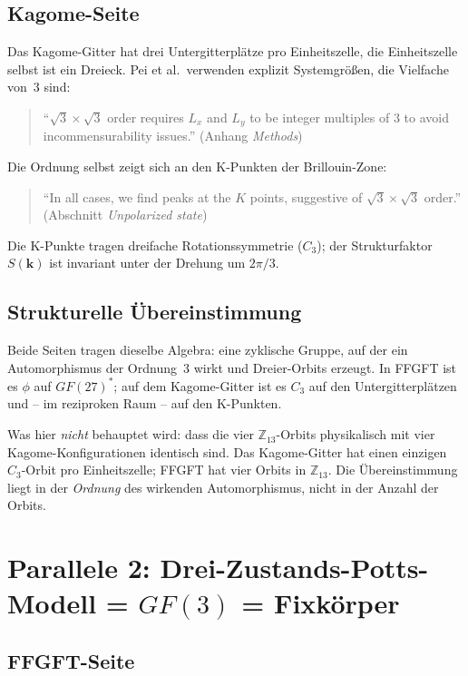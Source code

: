 \subsection{Kagome-Seite}

Das Kagome-Gitter hat drei Untergitterplätze pro Einheitszelle, die
Einheitszelle selbst ist ein Dreieck. Pei et al.\ verwenden explizit
Systemgrößen, die Vielfache von~3 sind:
\begin{quote}\QM
\enquote{$\sqrt{3}\times\sqrt{3}$ order requires $L_x$ and $L_y$ to be
integer multiples of 3 to avoid incommensurability issues.}
(Anhang \emph{Methods})
\end{quote}
Die Ordnung selbst zeigt sich an den K-Punkten der Brillouin-Zone:
\begin{quote}\QM
\enquote{In all cases, we find peaks at the $K$ points, suggestive of
$\sqrt{3}\times\sqrt{3}$ order.} (Abschnitt \emph{Unpolarized state})
\end{quote}
Die K-Punkte tragen dreifache Rotationssymmetrie ($C_3$); der
Strukturfaktor $S(\mathbf{k})$ ist invariant unter der Drehung um $2\pi/3$.

\subsection{Strukturelle Übereinstimmung}

Beide Seiten tragen dieselbe Algebra: eine zyklische Gruppe, auf der ein
Automorphismus der Ordnung~3 wirkt und Dreier-Orbits erzeugt. In FFGFT ist es
$\phi$ auf $GF(27)^*$; auf dem Kagome-Gitter ist es $C_3$ auf den
Untergitterplätzen und -- im reziproken Raum -- auf den K-Punkten. \SM

Was hier \emph{nicht} behauptet wird: dass die vier $\mathbb{Z}_{13}$-Orbits
physikalisch mit vier Kagome-Konfigurationen identisch sind. Das Kagome-Gitter
hat einen einzigen $C_3$-Orbit pro Einheitszelle; FFGFT hat vier Orbits in
$\mathbb{Z}_{13}$. Die Übereinstimmung liegt in der \emph{Ordnung} des
wirkenden Automorphismus, nicht in der Anzahl der Orbits.

\section{Parallele 2: Drei-Zustands-Potts-Modell = $GF(3)$ = Fixkörper}

\subsection{FFGFT-Seite}

